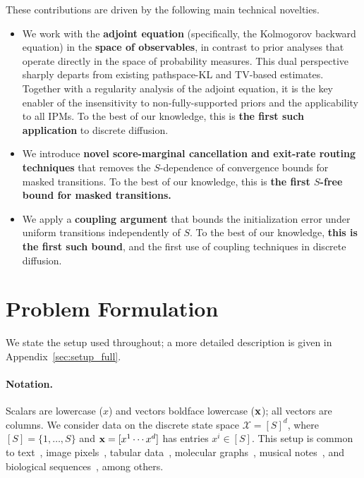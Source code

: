 \documentclass{article} %
\newcommand{\bfx}{{\bf x}}
\begin{document}
These contributions are driven by the following main technical novelties.
\begin{itemize}
    \item We work with the \textbf{adjoint equation} (specifically, the Kolmogorov backward equation) in the \textbf{space of observables}, in contrast to prior analyses that operate directly in the space of probability measures. This dual perspective sharply departs from existing pathspace-KL and TV-based estimates. Together with a regularity analysis of the adjoint equation, it is the key enabler of the insensitivity to non-fully-supported priors and the applicability to all IPMs. To the best of our knowledge, this is \textbf{the first such application} to discrete diffusion.
    \item We introduce \textbf{novel score-marginal cancellation and exit-rate routing techniques} that removes the $S$-dependence of convergence bounds for masked transitions. To the best of our knowledge, this is \textbf{the first $S$-free bound for masked transitions.}
    \item We apply a \textbf{coupling argument} that bounds the initialization error under uniform transitions independently of $S$. To the best of our knowledge, \textbf{this is the first such bound}, and the first use of coupling techniques in discrete diffusion.
\end{itemize}

\section{Problem Formulation}\label{sec:setup}
We state the setup used throughout; a more detailed description is given in Appendix~\ref{sec:setup_full}.

\paragraph{Notation.} Scalars are lowercase ($x$) and vectors boldface lowercase ($\bfx$); all vectors are columns. We consider data on the discrete state space $\mathcal{X} = [S]^d$, where $[S] = \{1,\dotsc,S\}$ and $\bfx = [x^1 \dotsm x^d]$ has entries $x^i \in [S]$. This setup is common to text~\citep{lou2024discrete}, image pixels~\citep{campbell2022continuous}, tabular data~\citep{kotelnikov2023tabddpm}, molecular graphs~\citep{vignac2023digress}, musical notes~\citep{campbell2022continuous}, and biological sequences~\citep{schiff2025simple,campbell2024generative}, among others.
\end{document}
